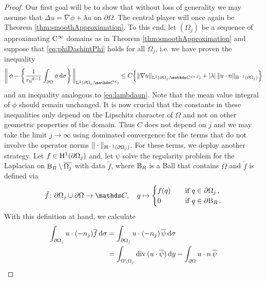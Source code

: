 \begin{proof}
  Our first goal will be to show that without loss of generality we may assume that $\Delta u = \nabla \phi + \lambda u$ on $\partial\Omega$.
  The central player will once again be Theorem \ref{thm:smoothApproximation}.
  To this end, let $(\Omega_j)$ be a sequence of approximating $\mathrm{C}^\infty$ domains as in Theorem \ref{thm:smoothApproximation} and suppose that
  \ref{eq:phiDashintPhi} holds for all $\Omega_j$, i.e. we have proven the inequality
  \begin{align}
    \label{eq:phiDashintPhij}
    \bigg\|\, \phi - \bigg\{ \frac{1}{{r_0}^{d - 1}}\int_{\partial\Omega} \phi \d\sigma \bigg\} \, \bigg\|_{\Ell^2(\partial\Omega_j; \C^d)}
     \leq C \Big\{ \|\nabla u\|_{\Ell^2(\partial\Omega_j; \C^{d\times d})} + |\lambda| \, \|u\cdot n\|_{\HH^{-1}(\partial\Omega_j)} \Big\}
  \end{align}
  and an inequality analogous to \eqref{eq:lambdaun}.
  Note that the mean value integral of $\phi$ should remain unchanged.
  It is now crucial that the constants in these inequalities only depend on the Lipschitz character of $\Omega$ and not on other geometric properties of the domain.
  Thus $C$ does not depend on $j$ and we may take the limit $j \to \infty$ using dominated convergence for the terms that do not involve the operator norms $\| \cdot \|_{\mathrm{H}^{-1}(\partial\Omega_j)}$. 
  For these terms, we deploy another strategy.
  Let $f \in \mathrm{H}^1(\partial\Omega_j)$ and, let $\psi$ solve the regularity problem for the Laplacian on $\mathrm{B}_R \setminus \overline{\Omega_j}$ with data $\tilde f$, where $\mathrm{B}_R$ is a Ball that contains $\overline\Omega$ and $\tilde f$ is defined via
  \begin{align*}
    \tilde f \colon \partial\Omega_j\cup \partial\Omega  \to \C, \quad q \mapsto 
    \begin{cases}
      f(q) &\quad\text{if } q \in \partial\Omega_j\,, \\
      0 &\quad\text{if } q \in \partial\BB_R\,.
    \end{cases}
  \end{align*}
  With this definition at hand, we calculate
  \begin{align*}
    \int_{\partial\Omega_j} u \cdot (-n_j) \overline f \d\sigma
    &= \int_{\partial\Omega_j} u \cdot (-n_j) \, \overline \psi \d \sigma \\
    &= \int_{\Omega \setminus \Omega_j} \div(u \cdot \overline\psi) \d y - \int_{\partial\Omega} u\cdot n \, \overline \psi \\

\end{align*}
\end{proof}
